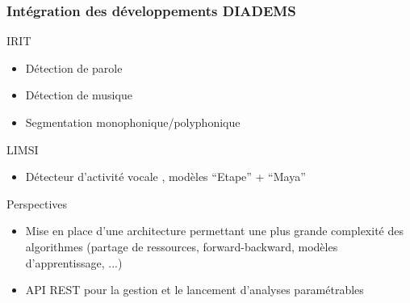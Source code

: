 \documentclass[10pt, final, hyperref, table]{beamer}
\begin{document}
\begin{frame}
  \frametitle{Intégration des développements DIADEMS}
  \begin{block}{IRIT}
    \begin{itemize}
    \item Détection de parole
    \item Détection de musique 
    \item Segmentation monophonique/polyphonique 
    \end{itemize}
  \end{block}
  \begin{block}{LIMSI}
    \begin{itemize}
    \item Détecteur d'activité vocale , modèles ``Etape'' + ``Maya''
    \end{itemize}
  \end{block}
  \begin{block}{Perspectives}
    \begin{itemize}
    \item Mise en place d'une architecture permettant une plus grande complexité des algorithmes (partage de ressources, forward-backward, modèles d'apprentissage, ...)
    \item API REST pour la gestion et le lancement d'analyses paramétrables

    \end{itemize}
    
  \end{block}
\end{frame}
\end{document}
